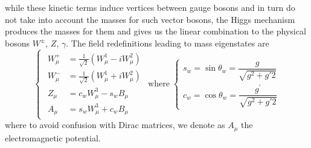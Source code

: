 while these kinetic terms induce vertices between gauge bosons and in turn do not take into account the masses for such vector bosons, the Higgs mechanism produces the masses for them and gives us the linear combination to the physical bosons $W^\pm$, $Z$, $\gamma$. The field redefinitions leading to mass eigenstates are
\begin{equation}
\begin{cases}
	\begin{aligned}
		W_{\mu}^{+} &=\frac{1}{\sqrt{2}}\left(W_{\mu}^{1}-i W_{\mu}^{2}\right) \\
		W_{\mu}^{-} &=\frac{1}{\sqrt{2}}\left(W_{\mu}^{1}+i W_{\mu}^{2}\right) \\
		Z_{\mu} &=c_{w} W_{\mu}^{3}-s_{w} B_{\mu} \\
		A_{\mu} &=s_{w} W_{\mu}^{3}+c_{w} B_{\mu}
	\end{aligned}
\end{cases}
\text{where}
\;
\begin{cases}
	s_{w}=\sin \theta_{w}=\dfrac{g}{\sqrt{g^{2}+g{\prime2}}}\\
	c_{w}=\cos \theta_{w}=\dfrac{g^\prime}{\sqrt{g^{2}+g{\prime2}}}
\end{cases}
\end{equation}
where to avoid confusion with Dirac matrices, we denote as $A_\mu$ the electromagnetic potential.

